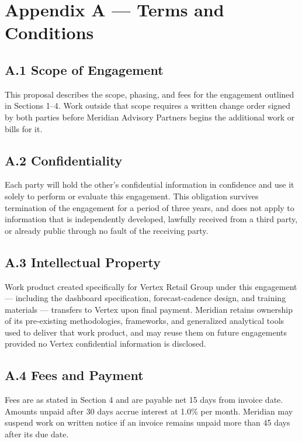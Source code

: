 \section*{Appendix A --- Terms and Conditions}

\subsection*{A.1 Scope of Engagement}
This proposal describes the scope, phasing, and fees for the engagement
outlined in Sections 1--4. Work outside that scope requires a written change
order signed by both parties before Meridian Advisory Partners begins the
additional work or bills for it.

\subsection*{A.2 Confidentiality}
Each party will hold the other's confidential information in confidence and
use it solely to perform or evaluate this engagement. This obligation
survives termination of the engagement for a period of three years, and does
not apply to information that is independently developed, lawfully received
from a third party, or already public through no fault of the receiving
party.

\subsection*{A.3 Intellectual Property}
Work product created specifically for Vertex Retail Group under this
engagement --- including the dashboard specification, forecast-cadence design,
and training materials --- transfers to Vertex upon final payment. Meridian
retains ownership of its pre-existing methodologies, frameworks, and
generalized analytical tools used to deliver that work product, and may reuse
them on future engagements provided no Vertex confidential information is
disclosed.

\subsection*{A.4 Fees and Payment}
Fees are as stated in Section 4 and are payable net 15 days from invoice
date. Amounts unpaid after 30 days accrue interest at 1.0\% per month.
Meridian may suspend work on written notice if an invoice remains unpaid more
than 45 days after its due date.

